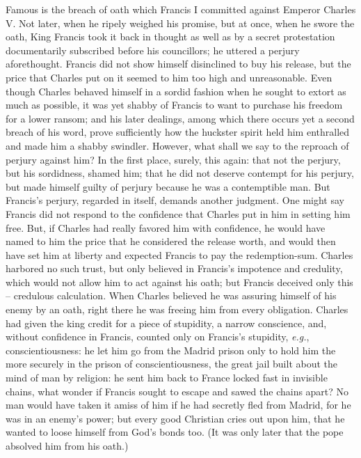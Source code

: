 \documentclass[12pt,a4paper]{book}
\begin{document}
Famous is the breach of oath which Francis I committed against Emperor Charles 
V. Not later, when he ripely weighed his promise, but at once, when he swore 
the oath, King Francis took it back in thought as well as by a secret 
protestation documentarily subscribed before his councillors; he uttered a 
perjury aforethought. Francis did not show himself disinclined to buy his 
release, but the price that Charles put on it seemed to him too high and 
unreasonable. Even though Charles behaved himself in a sordid fashion when he 
sought to extort as much as possible, it was yet shabby of Francis to want to 
purchase his freedom for a lower ransom; and his later dealings, among which 
there occurs yet a second breach of his word, prove sufficiently how the 
huckster spirit held him enthralled and made him a shabby swindler. However, 
what shall we say to the reproach of perjury against him? In the first place, 
surely, this again: that not the perjury, but his sordidness, shamed him; that 
he did not deserve contempt for his perjury, but made himself guilty of 
perjury because he was a contemptible man. But Francis's perjury, regarded in 
itself, demands another judgment. One might say Francis did not respond to the 
confidence that Charles put in him in setting him free. But, if Charles had 
really favored him with confidence, he would have named to him the price that 
he considered the release worth, and would then have set him at liberty and 
expected Francis to pay the redemption-sum. Charles harbored no such trust, 
but only believed in Francis's impotence and credulity, which would not allow 
him to act against his oath; but Francis deceived only this -- credulous 
calculation. When Charles believed he was assuring himself of his enemy by an 
oath, right there he was freeing him from every obligation. Charles had given 
the king credit for a piece of stupidity, a narrow conscience, and, without 
confidence in Francis, counted only on Francis's stupidity, \textit{e.g.}, 
conscientiousness: he let him go from the Madrid prison only to hold him the 
more securely in the prison of conscientiousness, the great jail built about 
the mind of man by religion: he sent him back to France locked fast in 
invisible chains, what wonder if Francis sought to escape and sawed the chains 
apart? No man would have taken it amiss of him if he had secretly fled from 
Madrid, for he was in an enemy's power; but every good Christian cries out 
upon him, that he wanted to loose himself from God's bonds too. (It was only 
later that the pope absolved him from his oath.)
\end{document}
